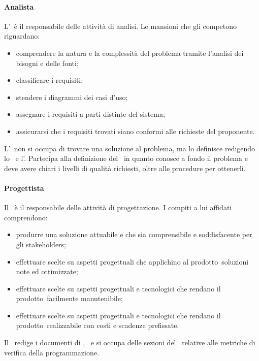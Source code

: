\documentclass[../NormeProgetto.tex]{subfiles}
\begin{document}
		\paragraph{Analista}
			L'\analista\ è il responsabile delle attività di analisi. Le mansioni che gli competono riguardano:
			\begin{itemize}
				\item comprendere la natura e la complessità del problema tramite l'analisi dei bisogni e delle fonti;
				\item classificare i requisiti;
				\item stendere i diagrammi dei casi d'uso;
				\item assegnare i requisiti a parti distinte del sistema;
				\item assicurarsi che i requisiti trovati siano conformi alle richieste del proponente.
			\end{itemize}
			L'\analista\ non si occupa di trovare una soluzione al problema, ma lo definisce redigendo lo \studiodifattibilita\ e l'\analisideirequisiti. Partecipa alla definizione del \pianodiqualifica\ in quanto conosce a fondo il problema e deve avere chiari i livelli di qualità richiesti, oltre alle procedure per ottenerli. 
		\paragraph{Progettista}
			Il \progettista\ è il responsabile delle attività di progettazione. I compiti a lui affidati comprendono:
			\begin{itemize}
				\item produrre una soluzione attuabile e che sia comprensibile e soddisfacente per gli stakeholders;
				\item effettuare scelte su aspetti progettuali che applichino al prodotto\g\ soluzioni note ed ottimizzate;
				\item effettuare scelte su aspetti progettuali e tecnologici che rendano il prodotto\g\ facilmente manutenibile;
				\item effettuare scelte su aspetti progettuali e tecnologici che rendano il prodotto\g\ realizzabile con costi e scadenze prefissate.
			\end{itemize}
			Il \progettista\ redige i documenti di \specificatecnica, \ e si occupa delle sezioni del \pianodiqualifica\ relative alle metriche di verifica della programmazione.
\end{document}
